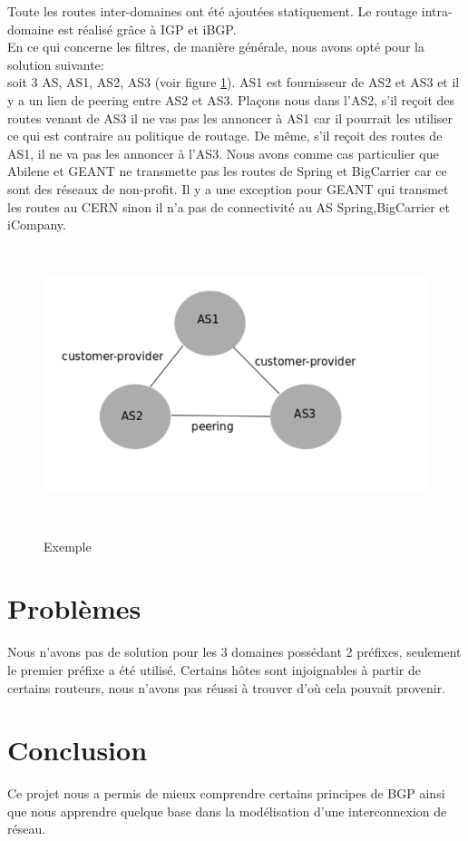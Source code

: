 \documentclass[a4paper,12pt]{report} %
\begin{document}
Toute les routes inter-domaines ont été ajoutées statiquement. Le routage intra-domaine est réalisé grâce à IGP et iBGP.\\

En ce qui concerne les filtres, de manière générale, nous avons opté pour la solution suivante:\\
soit 3 AS, AS1, AS2, AS3 (voir figure \ref{as}). AS1 est fournisseur de AS2 et AS3 et il y a un lien de peering entre AS2 et AS3. Plaçons nous dans l'AS2, s'il reçoit des routes venant de AS3 il ne vas pas les annoncer à 	AS1 car il pourrait les utiliser ce qui est contraire au politique de routage. De même, s'il reçoit des routes de AS1, il ne va pas les annoncer à l'AS3. Nous avons comme cas particulier que Abilene et GEANT ne transmette pas les routes de Spring et BigCarrier car ce sont des réseaux de non-profit. Il y a une exception pour GEANT qui transmet les routes au CERN sinon il n'a pas de connectivité au AS Spring,BigCarrier et iCompany.
\begin{figure}[!h] %
		\centering
		\includegraphics[width=120mm,height=80mm]{as}
		\label{as}
		\caption{Exemple}
	\end{figure} 
	
\section{Problèmes}
Nous n'avons pas de solution pour les 3 domaines possédant 2 préfixes, seulement le premier préfixe a été utilisé. Certains hôtes sont injoignables à partir de certains routeurs, nous n'avons pas réussi à trouver d'où cela pouvait provenir. 

\section{Conclusion}
Ce projet nous a permis de mieux comprendre certains principes de BGP ainsi que nous apprendre quelque base dans la modélisation d'une interconnexion de réseau.
\end{document}
